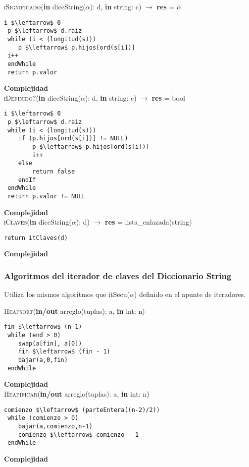 \textsc{iSignificado}(\textbf{in} diccString($\alpha$): d, \textbf{in} string: c) $\rightarrow$ \textbf{res} = $\alpha$
\begin{lstlisting}[mathescape]
 i $\leftarrow$ 0
 p $\leftarrow$ d.raiz
 while (i < (longitud(s)))
	p $\leftarrow$ p.hijos[ord(s[i])]
 i++
 endWhile
 return p.valor
\end{lstlisting}
\textbf{Complejidad}\\

\textsc{iDefinido?}(\textbf{in} diccString($\alpha$): d, \textbf{in} string: c) $\rightarrow$ \textbf{res} = bool
\begin{lstlisting}[mathescape]
 i $\leftarrow$ 0
 p $\leftarrow$ d.raiz
 while (i < (longitud(s)))
 	if (p.hijos[ord(s[i])] != NULL)
		p $\leftarrow$ p.hijos[ord(s[i])]
		i++
	else
		return false
	endIf
 endWhile
 return p.valor != NULL
\end{lstlisting}
\textbf{Complejidad}\\

\textsc{iClaves}(\textbf{in} diccString($\alpha$): d) $\rightarrow$ \textbf{res} = lista\_enlazada(string)
\begin{lstlisting}[mathescape]
return itClaves(d)
\end{lstlisting}
\textbf{Complejidad}\\

\subsubsection{Algoritmos del iterador de claves del Diccionario String}

Utiliza los mismos algoritmos que itSecu($\alpha$) definido en el apunte de iteradores.

\textsc{Heapsort}(\textbf{in/out} arreglo(tuplas): a, \textbf{in} int: n)
\begin{lstlisting}[mathescape]
 fin $\leftarrow$ (n-1)
 while (end > 0)
 	swap(a[fin], a[0])
 	fin $\leftarrow$ (fin - 1)
 	bajar(a,0,fin)
 endWhile
\end{lstlisting}
\textbf{Complejidad}\\


\textsc{Heapificar}(\textbf{in/out} arreglo(tuplas): a, \textbf{in} int: n)
\begin{lstlisting}[mathescape]
 comienzo $\leftarrow$ (parteEntera((n-2)/2))
 while (comienzo > 0)
 	bajar(a,comienzo,n-1)
 	comienzo $\leftarrow$ comienzo - 1
 endWhile
\end{lstlisting}
\textbf{Complejidad}\\

